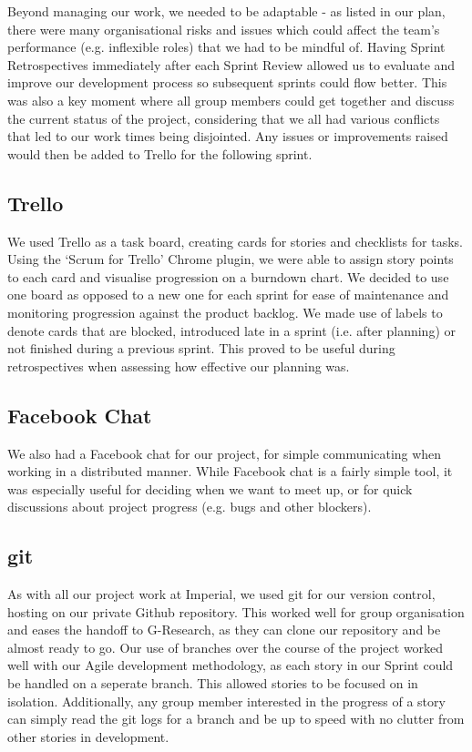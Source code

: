 Beyond managing our work, we needed to be adaptable - as listed in our plan, there were many organisational risks and issues which could affect the team's performance (e.g. inflexible roles) that we had to be mindful of. Having Sprint Retrospectives immediately after each Sprint Review allowed us to evaluate and improve our development process so subsequent sprints could flow better. This was also a key moment where all group members could get together and discuss the current status of the project, considering that we all had various conflicts that led to our work times being disjointed. Any issues or improvements raised would then be added to Trello for the following sprint.

\subsection{Trello}
We used Trello as a task board, creating cards for stories and checklists for tasks. Using the `Scrum for Trello' Chrome plugin\cite{scrumfortrello}, we were able to assign story points to each card and visualise progression on a burndown chart. We decided to use one board as opposed to a new one for each sprint for ease of maintenance and monitoring progression against the product backlog. We made use of labels to denote cards that are blocked, introduced late in a sprint (i.e. after planning) or not finished during a previous sprint. This proved to be useful during retrospectives when assessing how effective our planning was.

\subsection{Facebook Chat}
We also had a Facebook chat for our project, for simple communicating when working in a distributed manner. While Facebook chat is a fairly simple tool, it was especially useful for deciding when we want to meet up, or for quick discussions about project progress (e.g. bugs and other blockers).

\subsection{git}
As with all our project work at Imperial, we used git for our version control, hosting on our private Github repository. This worked well for group organisation and eases the handoff to G-Research, as they can clone our repository and be almost ready to go. Our use of branches over the course of the project worked well with our Agile development methodology, as each story in our Sprint could be handled on a seperate branch. This allowed stories to be focused on in isolation. Additionally, any group member interested in the progress of a story can simply read the git logs for a branch and be up to speed with no clutter from other stories in development.

